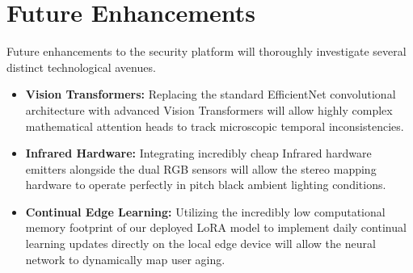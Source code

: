 \documentclass[12pt,a4paper]{report}
\begin{document}
\section{Future Enhancements}
Future enhancements to the security platform will thoroughly investigate several distinct technological avenues.
\begin{itemize}
    \item \textbf{Vision Transformers:} Replacing the standard EfficientNet convolutional architecture with advanced Vision Transformers will allow highly complex mathematical attention heads to track microscopic temporal inconsistencies.
    \item \textbf{Infrared Hardware:} Integrating incredibly cheap Infrared hardware emitters alongside the dual RGB sensors will allow the stereo mapping hardware to operate perfectly in pitch black ambient lighting conditions.
    \item \textbf{Continual Edge Learning:} Utilizing the incredibly low computational memory footprint of our deployed LoRA model to implement daily continual learning updates directly on the local edge device will allow the neural network to dynamically map user aging.
\end{itemize}
\end{document}
